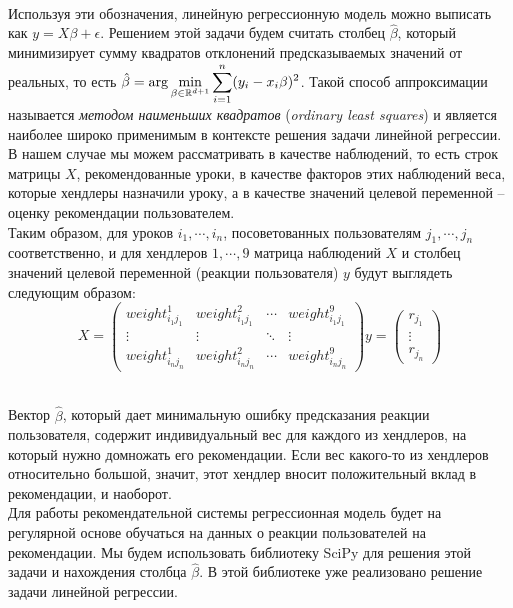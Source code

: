 \documentclass[12pt]{article}
\begin{document}
\\\indent Используя эти обозначения, линейную регрессионную модель можно выписать как $y = X \beta + \epsilon$. Решением этой задачи будем считать столбец $\hat\beta$, который минимизирует сумму квадратов отклонений предсказываемых значений от реальных, то есть $\displaystyle \hat\beta = {\rm arg}\min_{\beta\in\mathbb{R}^{d+1}} \sum_{i=1}^n (y_i - x_i \beta)^2$. Такой способ аппроксимации называется \textit{методом наименьших квадратов} (\textit{ordinary least squares}) и является наиболее широко применимым в контексте решения задачи линейной регрессии.
\\\indent В нашем случае мы можем рассматривать в качестве наблюдений, то есть строк матрицы $X$, рекомендованные уроки, в качестве факторов этих наблюдений веса, которые хендлеры назначили уроку, а в качестве значений целевой переменной -- оценку рекомендации пользователем.
\\\indent Таким образом, для уроков $i_1, \cdots, i_n$, посоветованных пользователям $j_1, \cdots, j_n$ соответственно, и для хендлеров $1, \cdots, 9$ матрица наблюдений $X$ и столбец значений целевой переменной (реакции пользователя) $y$ будут выглядеть следующим образом:
$$X =
  \begin{pmatrix} weight_{i_1 j_1}^1 & weight_{i_1 j_1}^2 & \cdots & weight_{i_1 j_1}^9 \\
                      \vdots & \vdots & \ddots & \vdots \\
                      weight_{i_n j_n}^1 & weight_{i_n j_n}^2 & \cdots & weight_{i_n j_n}^9 \end{pmatrix}
y = \left(\begin{array}{c}
      r_{j_1} \\
      \vdots \\
      r_{j_n}
    \end{array}
  \right)$$         
 
\\\indent Вектор $\hat\beta$, который дает минимальную ошибку предсказания реакции пользователя, содержит индивидуальный вес для каждого из хендлеров, на который нужно домножать его рекомендации. Если вес какого-то из хендлеров относительно большой, значит, этот хендлер вносит положительный вклад в рекомендации, и наоборот. 
\\\indent Для работы рекомендательной системы регрессионная модель будет на регулярной основе обучаться на данных о реакции пользователей на рекомендации. Мы будем использовать библиотеку SciPy\cite{scipy} для решения этой задачи и нахождения столбца $\hat\beta$. В этой библиотеке уже реализовано решение задачи линейной регрессии.
\end{document}

